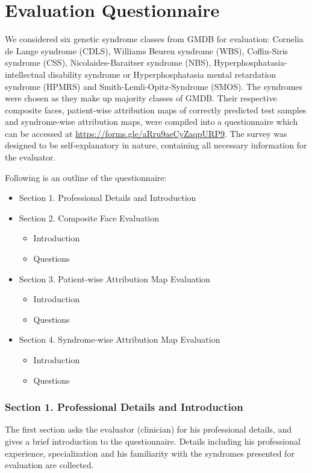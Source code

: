 \documentclass[../report.tex]{subfiles}
\begin{document}
   \section{Evaluation Questionnaire}
   We considered six genetic syndrome classes from GMDB for evaluation: Cornelia de Lange syndrome (CDLS), Williams Beuren syndrome (WBS),  Coffin-Siris syndrome (CSS),  Nicolaides-Baraitser syndrome (NBS), Hyperphosphatasia-intellectual disability syndrome or Hyperphosphatasia mental retardation syndrome (HPMRS) and Smith-Lemli-Opitz-Syndrome (SMOS). The syndromes were chosen as they make up majority classes of GMDB. Their respective composite faces, patient-wise attribution maps of correctly predicted test samples and syndrome-wise attribution maps, were compiled into a questionnaire which can be accessed at \url{https://forms.gle/aRru9aeCyZaqpURP9}. The survey was designed to be self-explanatory in nature, containing all necessary information for the evaluator.
   
   Following is an outline of the questionnaire:
   \begin{itemize}
   	\item Section 1. Professional Details and Introduction
   	\item Section 2. Composite Face Evaluation
   		\begin{itemize}
   		\item Introduction
   		\item Questions
   		\end{itemize}
   \item Section 3. Patient-wise Attribution Map Evaluation
   		\begin{itemize}
   		\item Introduction
   		\item Questions	
   		\end{itemize}
   	\item Section 4. Syndrome-wise Attribution Map Evaluation
   	\begin{itemize}
   	\item Introduction
   	\item Questions
   \end{itemize}
   \end{itemize}

   \subsubsection{Section 1. Professional Details and Introduction}
   The first section asks the evaluator (clinician) for his professional details, and gives a brief introduction to the questionnaire. Details including his professional experience, specialization and his familiarity with the syndromes presented for evaluation are collected. 
    
\end{document}
